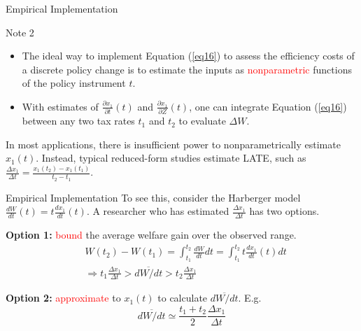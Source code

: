 \documentclass{beamer}
\begin{document}
\begin{frame}{Empirical Implementation}
	\begin{block}{Note 2}
		\begin{itemize}
			\item The ideal way to implement Equation (\ref{eq16}) to assess the efficiency costs of a discrete policy change is to estimate the inputs as \textcolor{red}{nonparametric} functions of the policy instrument $t$.
			\item With estimates of $\frac{\partial x_1}{\partial t}(t)$ and $\frac{\partial x_1}{\partial Z}(t)$, one can integrate Equation (\ref{eq16}) between any two tax rates $t_1$ and $t_2$ to evaluate $\Delta W$.
		\end{itemize}
	\end{block}
	\medskip

	In most applications, there is insufficient power to nonparametrically estimate $x_1(t)$. Instead, typical reduced-form studies estimate LATE, such as $\frac{\Delta x_1}{\Delta t}=\frac{x_1(t_2)-x_1(t_1)}{t_2-t_1}$.
\end{frame}
\begin{frame}{Empirical Implementation}
	To see this, consider the Harberger model $\frac{dW}{dt}(t)=t\frac{dx_1}{dt}(t)$. A researcher who has estimated $\frac{\Delta x_1}{\Delta t}$ has two options.
	\medskip

	\textbf{Option 1:} \textcolor{red}{bound} the average welfare gain over the observed range.
	\begin{equation}
		\begin{aligned}
			& W(t_2) - W(t_1) = \int_{t_1}^{t_2}\frac{dW}{dt}dt=\int_{t_1}^{t_2}t\frac{dx_1}{dt}(t)dt \\
			& \Rightarrow t_1\frac{\Delta x_1}{\Delta t}>\overline{dW/dt}>t_2\frac{\Delta x_1}{\Delta t}
		\end{aligned}
	\end{equation}

	\textbf{Option 2:} \textcolor{red}{approximate} to $x_1(t)$ to calculate $\overline{dW/dt}$. E.g.
	\begin{equation}
		\overline{dW/dt}\simeq \frac{t_1+t_2}{2}\frac{\Delta x_1}{\Delta t}
	\end{equation}
\end{frame}
\end{document}
